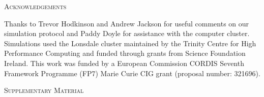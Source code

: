\documentclass[12pt,letterpaper]{article}
\renewcommand{\section}[1]{%
\bigskip
\begin{center}
\begin{Large}
\normalfont\scshape #1
\medskip
\end{Large}
\end{center}}
\begin{document}
%
%


\section{Acknowledgements}
Thanks to Trevor Hodkinson and Andrew Jackson %
for useful comments on our simulation protocol and Paddy Doyle for  assistance with the computer cluster. Simulations used the Lonsdale cluster maintained by the Trinity Centre for High Performance Computing and funded through grants from Science Foundation Ireland. %
This work was funded by a European Commission CORDIS Seventh Framework Programme (FP7) Marie Curie CIG grant (proposal number: 321696).



\section{Supplementary Material}
    
    \label{SupplementaryMaterial}


\end{document}
